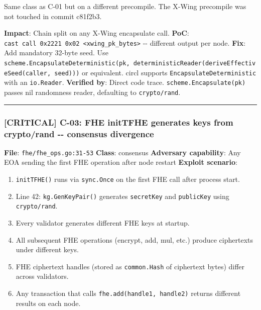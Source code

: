 \documentclass[
]{article}
\providecommand{\tightlist}{%
  \setlength{\itemsep}{0pt}\setlength{\parskip}{0pt}}
\begin{document}
Same class as C-01 but on a different precompile. The X-Wing precompile
was not touched in commit c81f2b3.

\textbf{Impact}: Chain split on any X-Wing encapsulate call.
\textbf{PoC}:
\texttt{cast\ call\ 0x2221\ 0x02\ \textless{}xwing\_pk\_bytes\textgreater{}}
-\/- different output per node. \textbf{Fix}: Add mandatory 32-byte
seed. Use
\texttt{scheme.EncapsulateDeterministic(pk,\ deterministicReader(deriveEffectiveSeed(caller,\ seed)))}
or equivalent. circl supports \texttt{EncapsulateDeterministic} with an
\texttt{io.Reader}. \textbf{Verified by}: Direct code trace.
\texttt{scheme.Encapsulate(pk)} passes nil randomness reader, defaulting
to \texttt{crypto/rand}.

\begin{center}\rule{0.5\linewidth}{0.5pt}\end{center}

\subsubsection{{[}CRITICAL{]} C-03: FHE initTFHE generates keys from
crypto/rand -\/- consensus
divergence}\label{critical-c-03-fhe-inittfhe-generates-keys-from-cryptorand----consensus-divergence}

\textbf{File}: \texttt{fhe/fhe\_ops.go:31-53} \textbf{Class}: consensus
\textbf{Adversary capability}: Any EOA sending the first FHE operation
after node restart \textbf{Exploit scenario}:

\begin{enumerate}
\def\labelenumi{\arabic{enumi}.}
\tightlist
\item
  \texttt{initTFHE()} runs via \texttt{sync.Once} on the first FHE call
  after process start.
\item
  Line 42: \texttt{kg.GenKeyPair()} generates \texttt{secretKey} and
  \texttt{publicKey} using \texttt{crypto/rand}.
\item
  Every validator generates different FHE keys at startup.
\item
  All subsequent FHE operations (encrypt, add, mul, etc.) produce
  ciphertexts under different keys.
\item
  FHE ciphertext handles (stored as \texttt{common.Hash} of ciphertext
  bytes) differ across validators.
\item
  Any transaction that calls \texttt{fhe.add(handle1,\ handle2)} returns
  different results on each node.
\end{enumerate}
\end{document}
